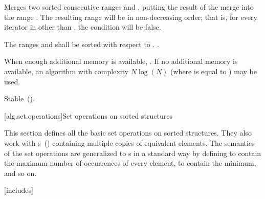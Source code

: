 \begin{itemdescr}
\pnum
\effects
Merges two sorted consecutive ranges
and
,
putting the result of the merge into the range
.
The resulting range will be in non-decreasing order;
that is, for every iterator
in
other than
,
the condition
will be false.

\pnum
\requires
The ranges  and  shall be
sorted with respect to  .
.

\begin{addedblock}
\pnum
\returns {}
\end{addedblock}

\pnum
\complexity
When enough additional memory is available,
.
If no additional memory is available, an algorithm with complexity
$N \log(N)$
(where
is equal to
)
may be used.

\pnum
\remarks Stable~().
\end{itemdescr}

[alg.set.operations]{Set operations on sorted structures}

\pnum
This section defines all the basic set operations on sorted structures.
They also work with
s~()
containing multiple copies of equivalent elements.
The semantics of the set operations are generalized to
s
in a standard way by defining
to contain the maximum number of occurrences of every element,
to contain the minimum, and so on.

[includes]{}


